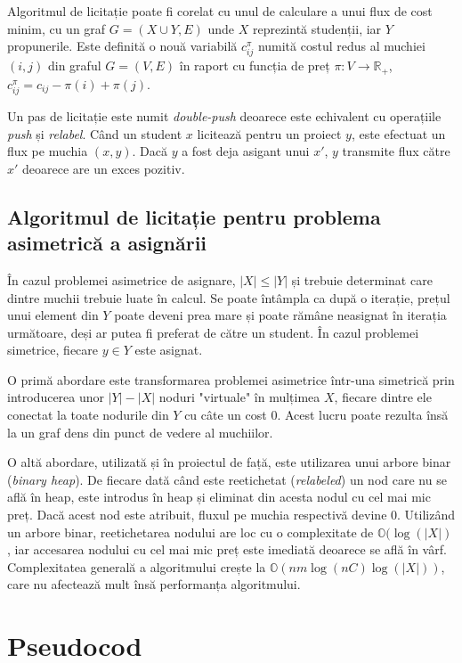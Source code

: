 Algoritmul de licitație poate fi corelat cu unul de calculare a unui flux de cost minim, cu un graf $G=(X \cup Y, E)$ unde $X$ reprezintă studenții, iar $Y$ propunerile. Este definită o nouă variabilă 
$c_{ij}^\pi$ numită costul redus al muchiei $(i, j)$ din graful $G=(V, E)$ în raport cu funcția de preț $\pi: V \rightarrow \mathbb{R}_+$,\; $c_{ij}^\pi = c_{ij} - \pi(i) + \pi(j)$.

Un pas de licitație este numit \textit{double-push} deoarece este echivalent cu operațiile \textit{push} și \textit{relabel}. Când un student $x$ licitează pentru un proiect $y$, este efectuat un flux pe muchia $(x, y)$. Dacă $y$ a fost deja asigant unui $x'$, $y$ transmite flux către $x'$ deoarece are un exces pozitiv.

\subsection{Algoritmul de licitație pentru problema asimetrică a asignării}

În cazul problemei asimetrice de asignare, $|X| \leq |Y|$ și trebuie determinat care dintre muchii trebuie luate în calcul. Se poate întâmpla ca după o iterație, prețul unui element din $Y$ poate deveni prea mare și poate rămâne neasignat în iterația următoare, deși ar putea fi preferat de către un student. În cazul problemei simetrice, fiecare $y \in Y$ este asignat.

O primă abordare este transformarea problemei asimetrice într-una simetrică prin introducerea unor $|Y| - |X|$ noduri "virtuale" în mulțimea $X$, fiecare dintre ele conectat la toate nodurile din $Y$  cu câte un cost 0. Acest lucru poate rezulta însă la un graf dens din punct de vedere al muchiilor.

O altă abordare, utilizată și în proiectul de față, este utilizarea unui arbore binar (\textit{binary heap}). De fiecare dată când este reetichetat (\textit{relabeled}) un nod care nu se află în heap, este introdus în heap și eliminat din acesta nodul cu cel mai mic preț. Dacă acest nod este atribuit, fluxul pe muchia respectivă devine 0. Utilizând un arbore binar, reetichetarea nodului are loc cu o complexitate de $\mathbb{O}(\log(|X|)$, iar accesarea nodului cu cel mai mic preț este imediată deoarece se află în vârf. Complexitatea generală a algoritmului crește la $\mathbb{O}(n m \log(n C) \log(|X|))$, care nu afectează mult însă performanța algoritmului.

\section{Pseudocod}

